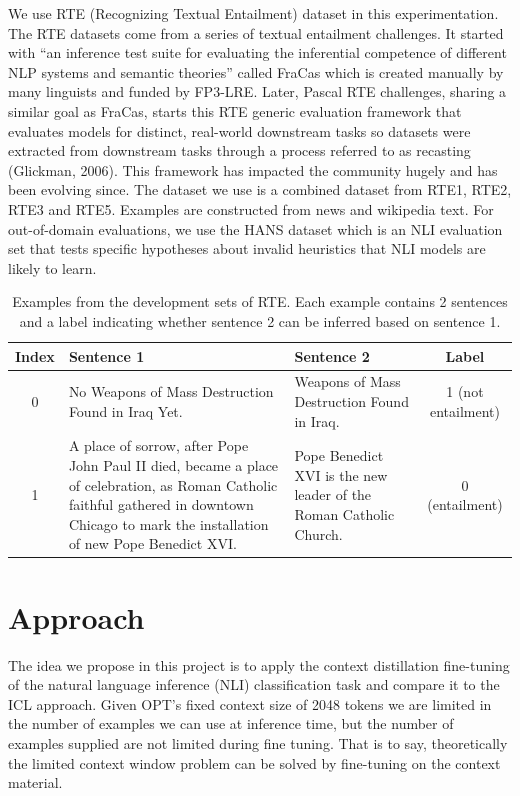 \documentclass[10pt,twocolumn,letterpaper]{article}
\begin{document}
We use RTE (Recognizing Textual Entailment) dataset in this experimentation. The RTE datasets come from a series of textual entailment challenges. It started with “an inference test suite for evaluating the inferential competence of different NLP systems and semantic theories” called FraCas which is created manually by many linguists and funded by FP3-LRE. Later, Pascal RTE challenges, sharing a similar goal as FraCas, starts this RTE generic evaluation framework that evaluates models for distinct, real-world downstream tasks so datasets were extracted from downstream tasks through a process referred to as recasting (Glickman, 2006). This framework has impacted the community hugely and has been evolving since. The dataset we use is a combined dataset from RTE1, RTE2, RTE3 and RTE5. Examples are constructed from news and wikipedia text. For out-of-domain evaluations, we use the HANS dataset which is an NLI evaluation set that tests specific hypotheses about invalid heuristics that NLI models are likely to learn.

\begin{table}
   \begin{center}
   \begin{tabular}{|c|p{6cm}|p{6cm}|c|}
   \hline
   Index & Sentence 1 & Sentence 2 & Label \\
   \hline
   0 & No Weapons of Mass Destruction Found in Iraq Yet. & Weapons of Mass Destruction Found in Iraq. &  1 (not entailment)\\
   \hline
   1 & A place of sorrow, after Pope John Paul II died, became a place of celebration, as Roman Catholic faithful gathered in downtown Chicago to mark the installation of new Pope Benedict XVI. & Pope Benedict XVI is the new leader of the Roman Catholic Church. & 0 (entailment) \\
   \hline
   \end{tabular}
   \end{center}
   \caption{Examples from the development sets of RTE. Each example contains 2 sentences and a label indicating whether sentence 2 can be inferred based on sentence 1.}
   \label{tab:contributions}
\end{table}
\section{Approach}
The idea we propose in this project is to apply the context distillation fine-tuning of
the natural language inference (NLI) classification task and compare it to the ICL approach. Given OPT’s fixed context size of 2048 tokens we are limited in the number of examples we can use at inference time, but the number of examples supplied are not limited during fine tuning. That is to say,  theoretically the limited context window problem can be solved by fine-tuning on the context material.
\end{document}
